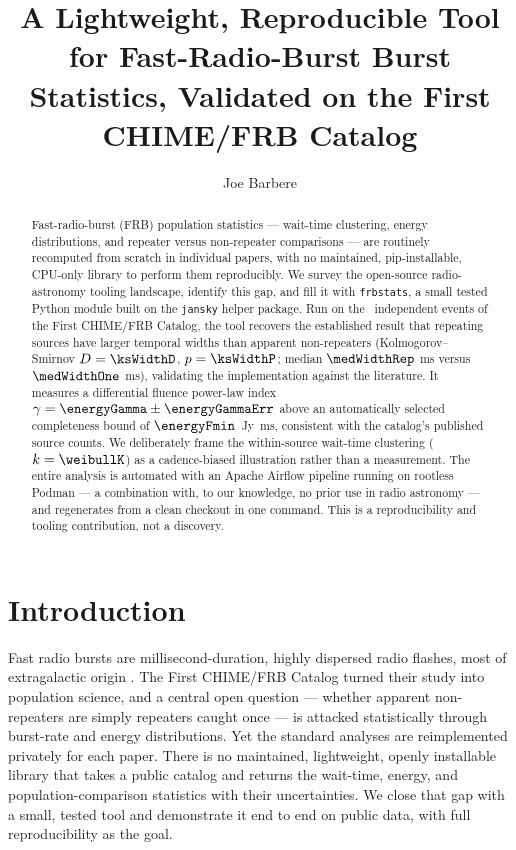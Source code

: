 \documentclass[twocolumn]{aastex631}
\newcommand{\code}[1]{\texttt{#1}}
\begin{document}
\title{A Lightweight, Reproducible Tool for Fast-Radio-Burst Burst Statistics,
Validated on the First CHIME/FRB Catalog}

\author{Joe Barbere}

\begin{abstract}
Fast-radio-burst (FRB) population statistics --- wait-time clustering, energy
distributions, and repeater versus non-repeater comparisons --- are routinely
recomputed from scratch in individual papers, with no maintained, pip-installable,
CPU-only library to perform them reproducibly. We survey the open-source radio-astronomy
tooling landscape, identify this gap, and fill it with \code{frbstats}, a small tested
Python module built on the \code{jansky} helper package. Run on the \nBursts\ independent
events of the First CHIME/FRB Catalog, the tool recovers the established result that
repeating sources have larger temporal widths than apparent non-repeaters
(Kolmogorov--Smirnov $D=\ksWidthD$, $p=\ksWidthP$; median $\medWidthRep$ ms versus
$\medWidthOne$ ms), validating the implementation against the literature. It measures a
differential fluence power-law index $\gamma=\energyGamma\pm\energyGammaErr$ above an
automatically selected completeness bound of $\energyFmin$~Jy~ms, consistent with the
catalog's published source counts. We deliberately frame the within-source wait-time
clustering ($k=\weibullK$) as a cadence-biased illustration rather than a measurement.
The entire analysis is automated with an Apache Airflow pipeline running on rootless
Podman --- a combination with, to our knowledge, no prior use in radio astronomy --- and
regenerates from a clean checkout in one command. This is a reproducibility and tooling
contribution, not a discovery.
\end{abstract}


\section{Introduction}
Fast radio bursts are millisecond-duration, highly dispersed radio flashes, most of
extragalactic origin \citep{chimecat1}. The First CHIME/FRB Catalog \citep{chimecat1}
turned their study into population science, and a central open question --- whether
apparent non-repeaters are simply repeaters caught once --- is attacked statistically
through burst-rate and energy distributions. Yet the standard analyses are reimplemented
privately for each paper. There is no maintained, lightweight, openly installable library
that takes a public catalog and returns the wait-time, energy, and population-comparison
statistics with their uncertainties. We close that gap with a small, tested tool and
demonstrate it end to end on public data, with full reproducibility as the goal.
\end{document}
